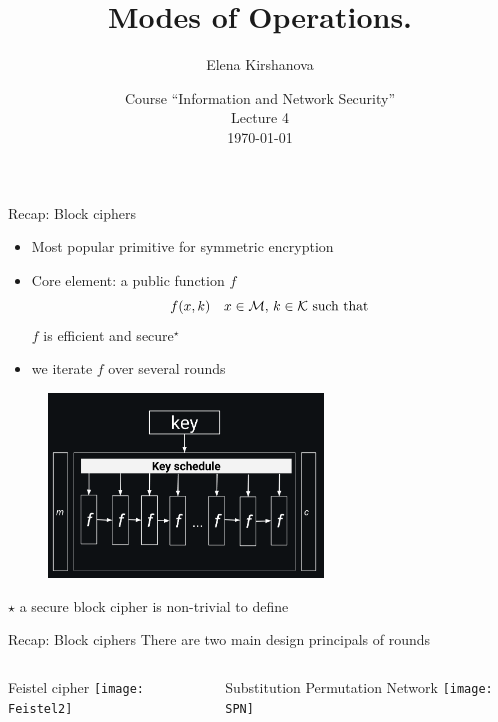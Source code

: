 \documentclass[usenames,dvipsnames, 9pt]{beamer}
\author{Elena Kirshanova \\ [10pt]
}
\title{\Huge Modes of Operations.}
\date{ Course ``Information and Network Security'' \\ 	
	Lecture 4 \\ \today }
\begin{document}
	
\begin{frame}
	\titlepage
\end{frame}


\begin{frame}{Recap: Block ciphers}
\LARGE 

\begin{itemize}
	\item Most popular primitive for symmetric encryption
	\item Core element: a {\color{Orange} public} function $f$
	\[
		f (x, k) \quad x \in \mathcal{M}, \, k \in \mathcal{K} \text{ such that }
	\]
	$f$ is  {\color{Orange} efficient} and {\color{Orange} secure$^\star$}
	\item we iterate $f$ over several rounds
\end{itemize}
\begin{figure}
	\includegraphics[width=0.65\textwidth]{BlockCipherGeneral}
\end{figure}

	\vfill  {\normalsize $\star$ a secure block cipher is non-trivial to define }

\end{frame}

\begin{frame}{Recap: Block ciphers}
\Large
There are two main design principals of rounds
\vspace{10pt}
\begin{columns}
	\centering
	\begin{column}{0.45\textwidth}
		{\color{Orange}Feistel cipher}
		\centering
		\texttt{[image: Feistel2]}
	\end{column}

\begin{column}{0.55\textwidth}
	{\color{Orange}Substitution Permutation Network }
	\centering
	\texttt{[image: SPN]}
\end{column}
\end{columns}

\end{frame}
\end{document}
